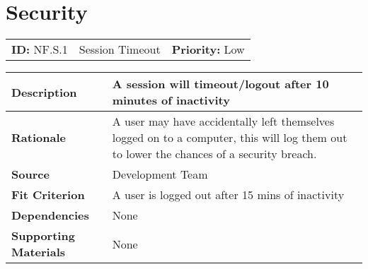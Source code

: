 \FloatBarrier

\section{Security}

\FloatBarrier

\begin{table}[H]
    \begin{tabularx}{\textwidth}{| l | X | l |}
        \hline
        \textbf{ID:} NF.S.1 & Session Timeout & \textbf{Priority:} Low \\
    \end{tabularx}
    \begin{tabularx}{\textwidth}{| l | X |}
        \hline
        \textbf{Description} & A session will timeout/logout after 10 minutes of inactivity\\ \hline
        \textbf{Rationale} &  A user may have accidentally left themselves logged on to a computer, this will log them out to lower the chances of a security breach. \\ \hline
        \textbf{Source} &  Development Team\\ \hline
        \textbf{Fit Criterion} & A user is logged out after 15 mins of inactivity\\ \hline
        \textbf{Dependencies} & None \\ \hline
        \textbf{Supporting Materials} & None \\ \hline
    \end{tabularx}
\end{table}

\FloatBarrier

